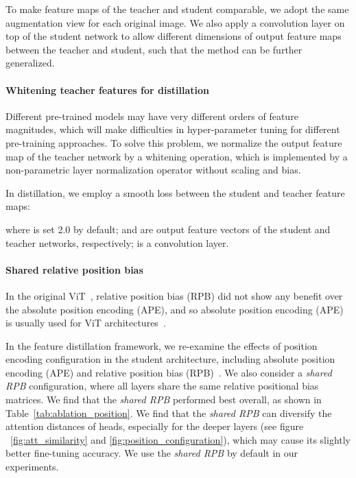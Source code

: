 \documentclass{article}
\begin{document}
To make feature maps of the teacher and student comparable, we adopt the same augmentation view for each original image. We also apply a  convolution layer on top of the student network to allow different dimensions of output feature maps between the teacher and student, such that the method can be further generalized.

\paragraph{Whitening teacher features for distillation} Different pre-trained models may have very different orders of feature magnitudes, which will make difficulties in hyper-parameter tuning for different pre-training approaches. To solve this problem, we normalize the output feature map of the teacher network by a whitening operation, which is implemented by a non-parametric layer normalization operator without scaling and bias.

In distillation, we employ a smooth  loss between the student and teacher feature maps:

where  is set 2.0 by default;  and  are output feature vectors of the student and teacher networks, respectively;  is a  convolution layer.

\paragraph{Shared relative position bias} In the original ViT~\cite{dosovitskiy2020vit}, relative position bias (RPB) did not show any benefit over the absolute position encoding (APE), and so absolute position encoding (APE) is usually used for ViT architectures~\cite{dosovitskiy2020vit,caron2021emerging,chen2021mocov3,MaskedAutoencoders2021}.

In the feature distillation framework, we re-examine the effects of position encoding configuration in the student architecture, including absolute position encoding (APE) and relative position bias (RPB)~\cite{liu2021swin}. We also consider a \emph{shared RPB} configuration, where all layers share the same relative positional bias matrices. We find that the \emph{shared RPB} performed best overall, as shown in Table~\ref{tab:ablation_position}. We find that the \emph{shared RPB} can diversify the attention distances of heads, especially for the deeper layers (see figure ~\ref{fig:att_similarity} and \ref{fig:position_configuration}), which may cause its slightly better fine-tuning accuracy. We use the \emph{shared RPB} by default in our experiments. 
\end{document}
